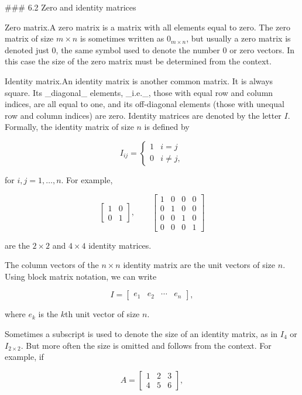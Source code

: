 

### 6.2 Zero and identity matrices

Zero matrix.A zero matrix is a matrix with all elements equal to zero. The zero matrix of size \(m\times n\) is sometimes written as \(0_{m\times n}\), but usually a zero matrix is denoted just 0, the same symbol used to denote the number 0 or zero vectors. In this case the size of the zero matrix must be determined from the context.

Identity matrix.An identity matrix is another common matrix. It is always square. Its _diagonal_ elements, _i.e._, those with equal row and column indices, are all equal to one, and its off-diagonal elements (those with unequal row and column indices) are zero. Identity matrices are denoted by the letter \(I\). Formally, the identity matrix of size \(n\) is defined by

\[I_{ij}=\left\{\begin{array}{ll}1&i=j\\ 0&i\neq j,\end{array}\right.\]

for \(i,j=1,\ldots,n\). For example,

\[\left[\begin{array}{cc}1&0\\ 0&1\end{array}\right],\qquad\left[\begin{array}{cccc}1&0&0&0\\ 0&1&0&0\\ 0&0&1&0\\ 0&0&0&1\end{array}\right]\]

are the \(2\times 2\) and \(4\times 4\) identity matrices.

The column vectors of the \(n\times n\) identity matrix are the unit vectors of size \(n\). Using block matrix notation, we can write

\[I=\left[\begin{array}{cccc}e_{1}&e_{2}&\cdots&e_{n}\end{array}\right],\]

where \(e_{k}\) is the \(k\)th unit vector of size \(n\).

Sometimes a subscript is used to denote the size of an identity matrix, as in \(I_{4}\) or \(I_{2\times 2}\). But more often the size is omitted and follows from the context. For example, if

\[A=\left[\begin{array}{cccc}1&2&3\\ 4&5&6\end{array}\right],\]

